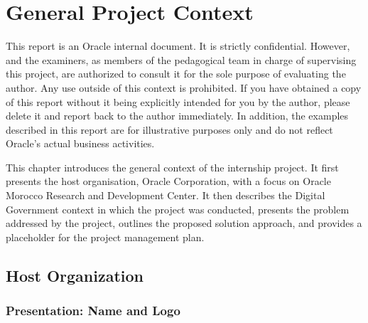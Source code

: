
\chapter{General Project Context}
\label{ch:introduction}

\begin{tcolorbox}[
  enhanced, colback=accentgold!8, colframe=accentgold,
  arc=3pt, boxrule=0.8pt, left=10pt, right=10pt, top=8pt, bottom=8pt,
  title={\bfseries\small IMPORTANT CONFIDENTIALITY WARNING},
  fonttitle=\color{chaptercolor},
  before skip=0pt, after skip=20pt
]
\small
This report is an Oracle internal document. It is strictly confidential. However, \SupervisorName{} and the examiners, as members of the \UniversityName{} pedagogical team in charge of supervising this project, are authorized to consult it for the sole purpose of evaluating the author. Any use outside of this context is prohibited. If you have obtained a copy of this report without it being explicitly intended for you by the author, please delete it and report back to the author immediately. In addition, the examples described in this report are for illustrative purposes only and do not reflect Oracle's actual business activities.
\end{tcolorbox}

This chapter introduces the general context of the internship project. It first
presents the host organisation, Oracle Corporation, with a focus on Oracle
Morocco Research and Development Center. It then describes the Digital
Government context in which the project was conducted, presents the problem
addressed by the project, outlines the proposed solution approach, and provides
a placeholder for the project management plan.

\section{Host Organization}
\label{sec:host_org}

\subsection{Presentation: Name and Logo}
\label{subsec:host_name_logo}

